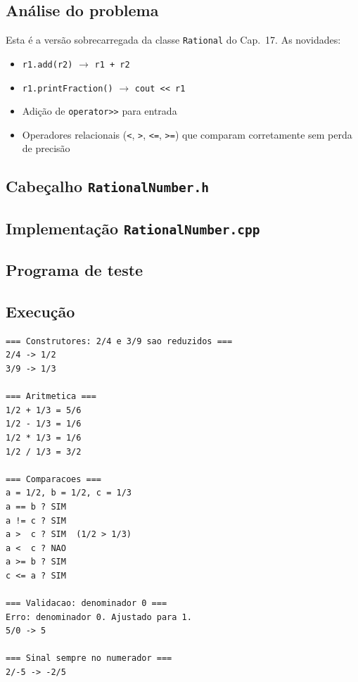 \documentclass[11pt,a4paper]{article}
\begin{document}
\subsection*{An\'alise do problema}

Esta \'e a vers\~ao sobrecarregada da classe \texttt{Rational} do Cap.~17. As novidades:

\begin{itemize}[leftmargin=*,itemsep=0pt]
  \item \texttt{r1.add(r2)} $\rightarrow$ \texttt{r1 + r2}
  \item \texttt{r1.printFraction()} $\rightarrow$ \texttt{cout << r1}
  \item Adi\c{c}\~ao de \texttt{operator>>} para entrada
  \item Operadores relacionais (\texttt{<}, \texttt{>}, \texttt{<=}, \texttt{>=}) que comparam corretamente sem perda de precis\~ao
\end{itemize}

\subsection*{Cabe\c{c}alho \texttt{RationalNumber.h}}



\subsection*{Implementa\c{c}\~ao \texttt{RationalNumber.cpp}}



\subsection*{Programa de teste}



\subsection*{Execu\c{c}\~ao}

\begin{saidabox}
\begin{lstlisting}[style=terminal]
=== Construtores: 2/4 e 3/9 sao reduzidos ===
2/4 -> 1/2
3/9 -> 1/3

=== Aritmetica ===
1/2 + 1/3 = 5/6
1/2 - 1/3 = 1/6
1/2 * 1/3 = 1/6
1/2 / 1/3 = 3/2

=== Comparacoes ===
a = 1/2, b = 1/2, c = 1/3
a == b ? SIM
a != c ? SIM
a >  c ? SIM  (1/2 > 1/3)
a <  c ? NAO
a >= b ? SIM
c <= a ? SIM

=== Validacao: denominador 0 ===
Erro: denominador 0. Ajustado para 1.
5/0 -> 5

=== Sinal sempre no numerador ===
2/-5 -> -2/5
\end{lstlisting}
\end{saidabox}
\end{document}
